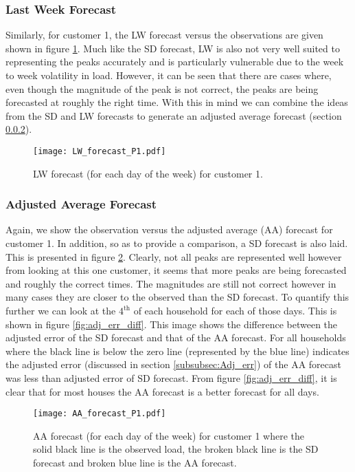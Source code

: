 \documentclass[a4paper]{article}
\begin{document}
\subsubsection{Last Week Forecast} \label{subsubsec:LW_res}
Similarly, for customer 1, the LW forecast versus the observations are given shown in figure \ref{fig:LW_forecast_P1}. Much like the SD forecast, LW is also not very well suited to representing the peaks accurately and is particularly vulnerable due to the week to week volatility in load. However, it can be seen that there are cases where, even though the magnitude of the peak is not correct, the peaks are being forecasted at roughly the right time. With this in mind we can combine the ideas from the SD and LW forecasts to generate an adjusted average forecast (section \ref{subsubsec:AA_res}).

\begin{figure}
\texttt{[image: LW\_forecast\_P1.pdf]}
\caption{LW forecast (for each day of the week) for customer 1.}
\label{fig:LW_forecast_P1} 
\end{figure}

\subsubsection{Adjusted Average Forecast} \label{subsubsec:AA_res}
Again, we show the observation versus the adjusted average (AA) forecast for customer 1. In addition, so as to provide a comparison, a SD forecast is also laid. This is presented in figure \ref{fig:AA_forecast_P1}. Clearly, not all peaks are represented well however from looking at this one customer, it seems that more peaks are being forecasted and roughly the correct times. The magnitudes are still not correct however in many cases they are closer to the observed than the SD forecast. To quantify this further we can look at the $4^{\text{th}}$ of each household for each of those days. This is shown in figure \ref{fig:adj_err_diff}. This image shows the difference between the adjusted error of the SD forecast and that of the AA forecast. For all households where the black line is below the zero line (represented by the blue line) indicates the adjusted error (discussed in section \ref{subsubsec:Adj_err}) of the AA forecast was less than adjusted error of SD forecast. From figure \ref{fig:adj_err_diff}, it is clear that for most houses the AA forecast is a better forecast for all days.

\begin{figure}
\centering
\texttt{[image: AA\_forecast\_P1.pdf]}
\caption{AA forecast (for each day of the week) for customer 1 where the solid black line is the observed load, the broken black line is the SD forecast and broken blue line is the AA forecast.}
\label{fig:AA_forecast_P1} 
\end{figure}
\end{document}
